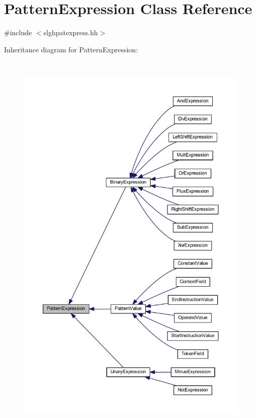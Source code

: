 \hypertarget{class_pattern_expression}{}\section{Pattern\+Expression Class Reference}
\label{class_pattern_expression}


{\ttfamily \#include $<$slghpatexpress.\+hh$>$}



Inheritance diagram for Pattern\+Expression\+:
\nopagebreak
\begin{figure}[H]
\begin{center}
\leavevmode
\includegraphics[height=550pt]{class_pattern_expression__inherit__graph}
\end{center}
\end{figure}
